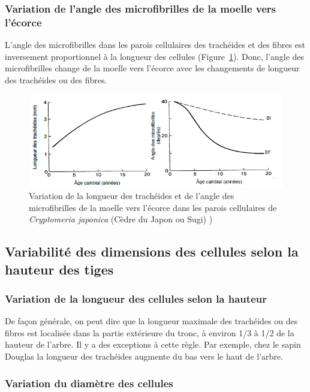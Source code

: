 \subsubsection{Variation de l'angle des microfibrilles de la moelle vers l'écorce}

L'angle des microfibrilles dans les parois cellulaires des trachéides et des fibres est inversement proportionnel à la longueur des cellules (Figure~\ref{fig:long_mfa_moelle}). Donc, l'angle des microfibrilles change de la moelle vers l'écorce avec les changements de longueur des trachéides ou des fibres.

\begin{figure}[h]
	\centering
	\includegraphics[scale=0.8]{img/ch7_long_mfa_moelle}
	\caption{Variation de la longueur des trachéides et de l'angle des microfibrilles de la moelle vers l'écorce dans les parois cellulaires de \textit{Cryptomeria japonica} (Cèdre du Japon ou Sugi) \cite{panshin1980textbook})}
	\label{fig:long_mfa_moelle}
\end{figure}

\subsection{Variabilité des dimensions des cellules selon la hauteur des tiges}

\subsubsection{Variation de la longueur des cellules selon la hauteur}

De façon générale, on peut dire que la longueur maximale des trachéides ou des fibres est localisée dans la partie extérieure du tronc, à environ 1/3 à 1/2 de la hauteur de l'arbre. Il y a des exceptions à cette règle. Par exemple, chez le sapin Douglas la longueur des trachéides augmente du bas vers le haut de l'arbre.

\subsubsection{Variation du diamètre des cellules}

